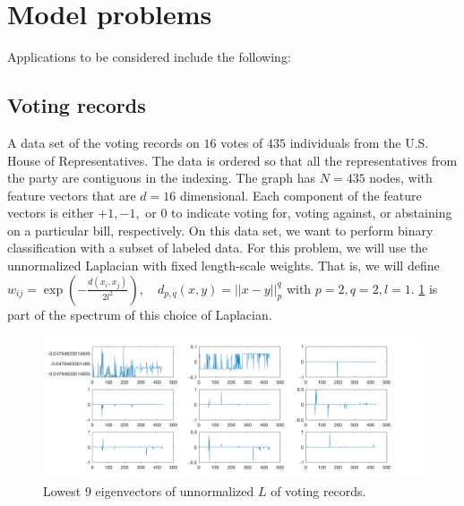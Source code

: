 \documentclass{siamart1116}
\begin{document}
\section{Model problems}
Applications to be considered include the following:
\subsection{Voting records}
A data set of the voting records on $16$ votes of $435$ individuals from the U.S. House of Representatives. The data is ordered so that all the representatives from the party are contiguous in the indexing. The graph has $N=435$ nodes, with feature vectors that are $d=16$ dimensional. Each component of the feature vectors is either $+1,-1,$ or $0$ to indicate voting for, voting against, or abstaining on a particular bill, respectively. On this data set, we want to perform binary classification with a subset of labeled data. For this problem, we will use the unnormalized Laplacian with fixed length-scale weights. That is, we will define $w_{ij} = \exp\left({-\frac{d(x_i,x_j)}{2l^2}}\right), \quad d_{p,q}(x,y) = ||x-y||^q_p$ with $p=2,q=2,l=1$. \cref{fig:voting_spec} is part of the spectrum of this choice of Laplacian.

\begin{figure}[!htb]
\caption{\label{fig:voting_spec} Lowest $9$ eigenvectors of unnormalized $L$ of voting records.}
\includegraphics[width=\linewidth]{laplacians/voting_laplacian.png}
\end{figure}
\end{document}
